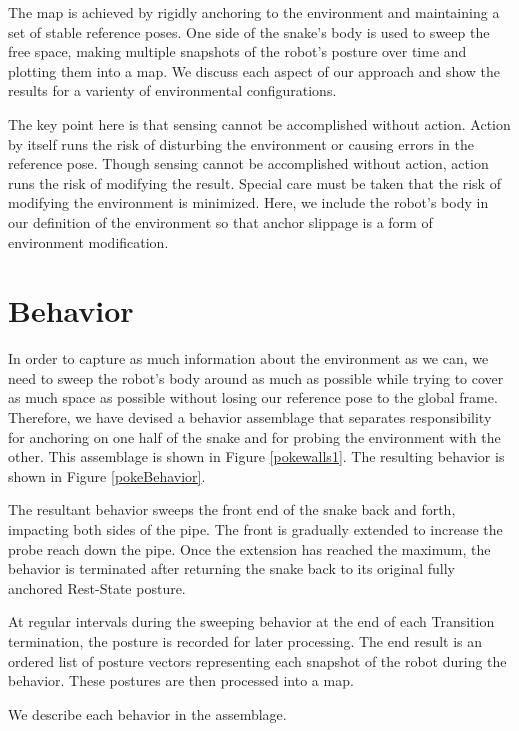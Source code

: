 The map is achieved by rigidly anchoring to the environment and maintaining a set of stable reference poses.  One side of the snake's body is used to sweep the free space, making multiple snapshots of the robot's posture over time and plotting them into a map.  We discuss each aspect of our approach and show the results for a varienty of environmental configurations.

The key point here is that sensing cannot be accomplished without action.  Action by itself runs the risk of disturbing the environment or causing errors in the reference pose.  Though sensing cannot be accomplished without action, action runs the risk of modifying the result.  Special care must be taken that the risk of modifying the environment is minimized.  Here, we include the robot's body in our definition of the environment so that anchor slippage is a form of environment modification.

\section{Behavior}

In order to capture as much information about the environment as we can, we need to sweep the robot's body around as much as possible while trying to cover as much space as possible without losing our reference pose to the global frame.  Therefore, we have devised a behavior assemblage that separates responsibility for anchoring on one half of the snake and for probing the environment with the other.  This assemblage is shown in Figure \ref{pokewalls1}.  The resulting behavior is shown in Figure \ref{pokeBehavior}.

The resultant behavior sweeps the front end of the snake back and forth, impacting both sides of the pipe.  The front is gradually extended to increase the probe reach down the pipe.  Once the extension has reached the maximum, the behavior is terminated after returning the snake back to its original fully anchored Rest-State posture.

At regular intervals during the sweeping behavior at the end of each Transition termination, the posture is recorded for later processing.  The end result is an ordered list of posture vectors representing each snapshot of the robot during the behavior.  These postures are then processed into a map.

We describe each behavior in the assemblage.


